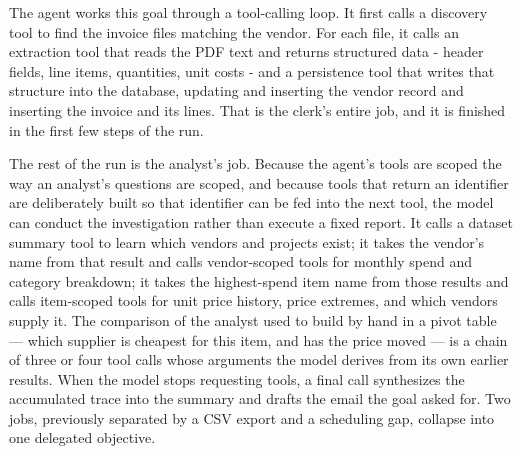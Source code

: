 \documentclass[conference]{IEEEtran}
\begin{document}
 The agent works this goal through a tool-calling loop. It first calls a discovery tool to find the invoice files matching the vendor. For each file, it calls an extraction tool that reads the PDF text and returns structured data - header fields, line items, quantities, unit costs - and a persistence tool that writes that structure into the database, updating and inserting the vendor record and inserting the invoice and its lines. That is the clerk's entire job, and it is finished in the first few steps of the run. 

The rest of the run is the analyst's job. Because the agent's tools are scoped the way an analyst's questions are scoped, and because tools that return an identifier are deliberately built so that identifier can be fed into the next tool, the model can conduct the investigation rather than execute a fixed report. It calls a dataset summary tool to learn which vendors and projects exist; it takes the vendor's name from that result and calls vendor-scoped tools for monthly spend and category breakdown; it takes the highest-spend item name from those results and calls item-scoped tools for unit price history, price extremes, and which vendors supply it. The comparison of the analyst used to build by hand in a pivot table — which supplier is cheapest for this item, and has the price moved — is a chain of three or four tool calls whose arguments the model derives from its own earlier results. When the model stops requesting tools, a final call synthesizes the accumulated trace into the summary and drafts the email the goal asked for. Two jobs, previously separated by a CSV export and a scheduling gap, collapse into one delegated objective. 
\end{document}
